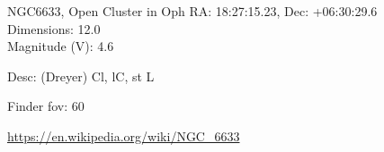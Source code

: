 \begin{block}{NGC6633, Open Cluster in Oph}
    RA: 18:27:15.23, Dec: +06:30:29.6 \\ 
    Dimensions: 12.0 \\ 
    Magnitude (V): 4.6


    Desc: (Dreyer) Cl, lC, st L 

    Finder fov: 60 

    \url{https://en.wikipedia.org/wiki/NGC_6633} 
\end{block}